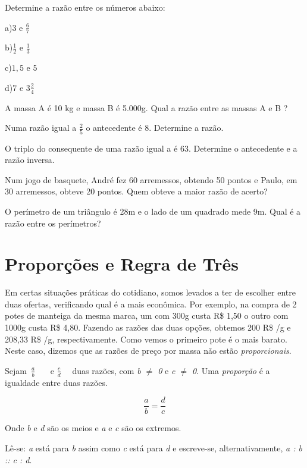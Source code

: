 \begin{exercicios}

	\exitem{} Determine a razão entre os números abaixo:

\begin{multicols}{4}
	a)$3$ e $\frac{6}{7}$
	
	b)$\frac{1}{2}$ e $\frac{1}{3}$
	
	c)$1,5$ e $5$
	
	d)$7$ e $3 \frac{2}{4}$
\end{multicols}

	\exitem{} A massa A é 10 kg e massa B é 5.000g. Qual a razão entre as massas A e B ?

	\exitem{} Numa razão igual a $\frac{2}{5}$ o antecedente é 8. Determine a razão.

	\exitem{} O triplo do consequente de uma razão igual a é 63. Determine o antecedente e a razão inversa.

	\exitem{} Num jogo de basquete, André fez 60 arremessos, obtendo 50 pontos e Paulo, em 30 arremessos, obteve 20 pontos. Quem obteve a maior razão de acerto?

	\exitem{} O perímetro de um triângulo é 28m e o lado de um quadrado mede 9m. Qual é a razão entre os perímetros?

\end{exercicios}

\section{Proporções e Regra de Três }

\quad Em certas situações práticas do cotidiano, somos levados a ter de escolher entre duas ofertas, verificando qual é a mais econômica. Por exemplo, na compra de 2 potes de manteiga da mesma marca, um com 300g custa R\$  1,50 o outro com 1000g custa R\$ 4,80. Fazendo as razões das duas opções, obtemos 200 R\$ /g e 208,33 R\$ /g, respectivamente. Como vemos o primeiro pote é o mais barato. Neste caso, dizemos que as razões de preço por massa não estão \textit{proporcionais}. 

\begin{caixa}
	\begin{tdefinicao}
		Sejam\   \( \frac{a}{b} \) \ \ \ e   \( \frac{c}{d} \) \ \  duas razões, com \textit{b $ \neq $  0} e \textit{c $ \neq $  0}. Uma \textit{proporção} é a igualdade entre duas razões.

		$$ \frac{a}{b}=\frac{d}{c} $$

		Onde \textit{b} e \textit{d} são os meios e \textit{a} e \textit{c} são os extremos.
	\end{tdefinicao}
\end{caixa}
Lê-se: \textit{a} está para \textit{b} assim como \textit{c} está para \textit{d} e escreve-se, alternativamente, \textit{a : b :: c : d}.

